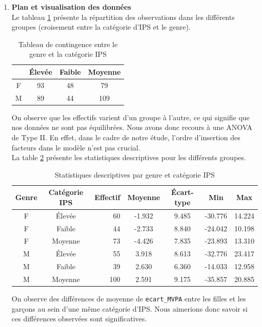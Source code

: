 \documentclass[12pt,a4paper]{article}
\begin{document}
\begin{enumerate}[label=\textbf{\alph*})]
	\item \textbf{Plan et visualisation des données} \\
	
	Le tableau \ref{table:contingence_2} présente la répartition des observations dans les différents groupes (croisement entre la catégorie d'IPS et le genre). 
	\begin{table}[H]
		\centering
		\caption{Tableau de contingence entre le genre et la catégorie IPS}
		\begin{tabular}{cccc}
			\toprule
			& Élevée & Faible & Moyenne \\
			\midrule
			F & 93 & 48 & 79 \\
			M & 89 & 44 & 109 \\
			\bottomrule
		\end{tabular}
		\label{table:contingence_2}
	\end{table}
	On observe que les effectifs varient d'un groupe à l'autre, ce qui signifie que nos données ne sont pas équilibrées. Nous avons donc recours à une ANOVA de Type II. En effet, dans le cadre de notre étude, l'ordre d'insertion des facteurs dans le modèle n'est pas crucial.\\
	
La table \ref{tab:desc_stats_ips} présente les statistiques descriptives pour les différents groupes.
\begin{table}[H]
	\centering
	\caption{Statistiques descriptives par genre et catégorie IPS}
	\begin{tabular}{ccrcccc}
		\toprule
		\textbf{Genre} & \textbf{Catégorie IPS} & \textbf{Effectif} & \textbf{Moyenne} & \textbf{Écart-type} & \textbf{Min} & \textbf{Max} \\
		\midrule
		F & Élevée & 60 & -1.932 & 9.485 & -30.776 & 14.224 \\
		F & Faible & 44 & -2.733 & 8.840 & -24.042 & 10.198 \\
		F & Moyenne & 73 & -4.426 & 7.835 & -23.893 & 13.310 \\
		M & Élevée & 55 & 3.918 & 8.613 & -32.776 & 23.417 \\
		M & Faible & 39 & 2.630 & 6.360 & -14.033 & 12.958 \\
		M & Moyenne & 100 & 2.591 & 9.175 & -35.857 & 20.885 \\
		\bottomrule
	\end{tabular}
	\label{tab:desc_stats_ips}
\end{table}
On observe des différences de moyenne de \texttt{ecart\_MVPA} entre les filles et les garçons au sein d'une même catégorie d'IPS. Nous aimerions donc savoir si ces différences observées sont significatives.\\



\end{enumerate}
\end{document}
